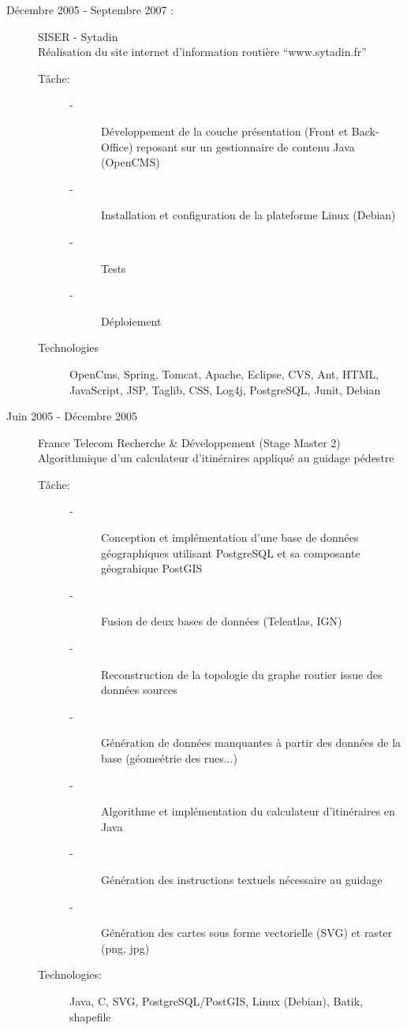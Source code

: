 \documentclass[11pt, a4paper, french]{article}
\begin{document}
\begin{description}
\item[D\'ecembre 2005 - Septembre 2007 :] SISER - Sytadin\\
  R\'ealisation du site internet d'information routi\`ere ``www.sytadin.fr''
  \begin{description}
  \item[T\^ache:]
    \begin{description}
    \item[-] D\'eveloppement de la couche pr\'esentation (Front et Back-Office) reposant sur un gestionnaire de contenu Java (OpenCMS)
    \item[-]Installation et configuration de la plateforme Linux (Debian)
    \item[-]Tests
    \item[-] D\'eploiement
    \end{description}

  \item[Technologies]  OpenCms, Spring, Tomcat, Apache, Eclipse, CVS, Ant, HTML, JavaScript, JSP, Taglib, CSS, Log4j, PostgreSQL, Junit, Debian
  \end{description}

\item[Juin 2005 - D\'ecembre 2005] France Telecom Recherche \& D\'eveloppement (Stage Master 2)\\
 Algorithmique d'un calculateur d'itin\'eraires  appliqu\'e au guidage p\'edestre
 \begin{description}
 \item[T\^ache:]
   \begin{description}
   \item[-] Conception et impl\'ementation d'une base de donn\'ees g\'eographiques utilisant PostgreSQL et sa composante g\'eograhique PostGIS
   \item[-] Fusion de deux bases de donn\'ees (Teleatlas, IGN)
   \item[-] Reconstruction de la topologie du graphe routier issue des donn\'ees sources 
   \item[-] G\'en\'eration de donn\'ees manquantes \`a partir des donn\'ees de la base (g\'eome\'etrie des rues...)
   \item[-] Algorithme et impl\'ementation du calculateur d'itin\'eraires en Java
   \item[-] G\'en\'eration des instructions textuels n\'ecessaire au guidage
   \item[-] G\'en\'eration des cartes sous forme vectorielle (SVG) et raster (png, jpg)
   \end{description}
 \item[Technologies:] Java, C, SVG, PostgreSQL/PostGIS, Linux (Debian), Batik, shapefile
 \end{description}
\end{description}
\end{document}
